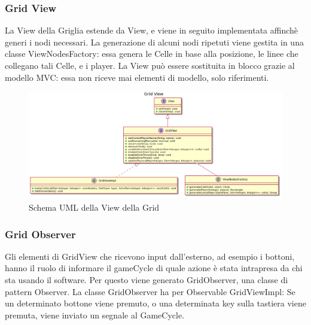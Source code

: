 \documentclass[a4paper,12pt]{report}
\begin{document}
    \subsubsection {Grid View}
	La View della Griglia estende da View, e viene in seguito implementata affinchè generi i nodi necessari.
	La generazione di alcuni nodi ripetuti viene gestita in una classe ViewNodesFactory: essa genera le Celle in base alla posizione, le linee che collegano tali Celle, e i player.
	La View può essere sostituita in blocco grazie al modello MVC: essa non riceve mai elementi di modello, solo riferimenti.

	\begin{figure}[h]
		\centering{}
		\includegraphics[width=150mm]{images/ascenzo/grid_view.png}
		\caption{Schema UML della View della Grid}
		\label{img:gridview}
	\end{figure}

    \subsubsection {Grid Observer}
	Gli elementi di GridView che ricevono input dall’esterno, ad esempio i bottoni, hanno il ruolo di informare il gameCycle di quale azione è stata intrapresa da chi sta usando il software.
	Per questo viene generato GridObserver, una classe di pattern Observer.
	La classe GridObserver ha per Observable GridViewImpl: Se un determinato bottone viene premuto, o una determinata key sulla tastiera viene premuta, viene inviato un segnale al GameCycle.
\end{document}
